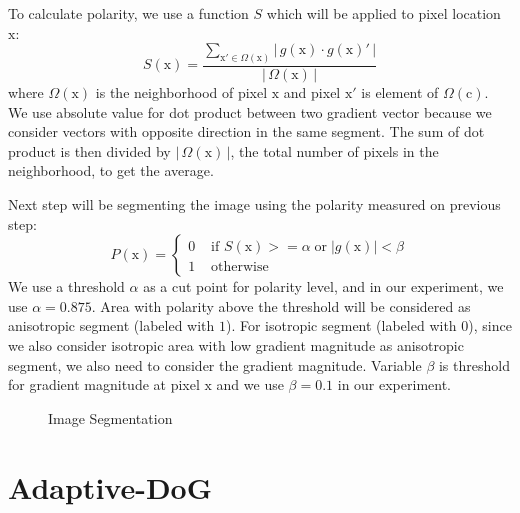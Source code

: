 To calculate polarity, we use a function $S$ which will be applied to pixel location $\mbox{x}$:
\begin{equation}
	S(\mbox{x})=\frac{\sum\limits_{\mathrm{x}' \in \Omega (\mathrm{x})}\left|\,g(\mbox{x}) \cdot g(\mbox{x})'\,|\right.}
		{\left|\,\Omega(\mathrm{x})\,|\right.}
\end{equation}
where $\Omega(\mbox{x})$ is the neighborhood of pixel $\mbox{x}$ and pixel $\mbox{x}'$ is element of $\Omega(\mbox{c})$. We use absolute value for dot product between two gradient vector because we consider vectors with opposite direction in the same segment. The sum of dot product is then divided by ${\left|\,\Omega(\mathrm{x})\,|\right.}$, the total number of pixels in the neighborhood, to get the average.

Next step will be segmenting the image using the polarity measured on previous step:
\begin{equation}
	P(\mbox{x})=
		\left\{
			\begin{array}{ll}
				0&\mbox{ if }S(\mbox{x}) >= \alpha \;\mbox{or}\; \left|g(\mbox{x})|\right. < \beta
				\\
				1&\mbox{ otherwise }
			\end{array}
		\right.
\end{equation}
We use a threshold $\alpha$ as a cut point for polarity level, and in our experiment, we use $\alpha = 0.875$. Area with polarity above the threshold will be considered as anisotropic segment (labeled with $1$). For isotropic segment (labeled with $0$), since we also consider isotropic area with low gradient magnitude as anisotropic segment, we also need to consider the gradient magnitude. Variable $\beta$ is threshold for gradient magnitude at pixel $\mbox{x}$ and we use $\beta = 0.1$ in our experiment. 
\begin{figure}[H]
	\centering
	\caption{Image Segmentation}
\end{figure}

\section{Adaptive-DoG}

